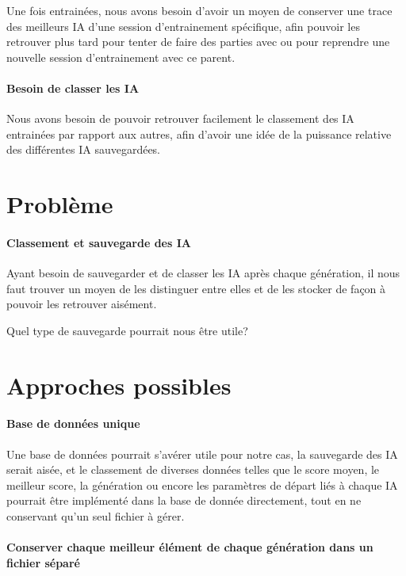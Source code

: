 \documentclass{scrreprt}
\begin{document}
			Une fois entrainées, nous avons besoin d'avoir un moyen de conserver une trace des meilleurs IA d'une session d'entrainement spécifique, afin pouvoir les retrouver plus tard pour tenter de faire des parties avec ou pour reprendre une nouvelle session d'entrainement avec ce parent.
		
			\paragraph{Besoin de classer les IA}
			
			Nous avons besoin de pouvoir retrouver facilement le classement des IA entrainées par rapport aux autres, afin d'avoir une idée de la puissance relative des différentes IA sauvegardées.
			
		
		\section{Problème}
		
			\paragraph{Classement et sauvegarde des IA}
			
			Ayant besoin de sauvegarder et de classer les IA après chaque génération, il nous faut trouver un moyen de les distinguer entre elles et de les stocker de façon à pouvoir les retrouver aisément.
			
			Quel type de sauvegarde pourrait nous être utile?
		
		\section{Approches possibles}
			\paragraph{Base de données unique}
			
			Une base de données pourrait s'avérer utile pour notre cas, la sauvegarde des IA serait aisée, et le classement de diverses données telles que le score moyen, le meilleur score, la génération ou encore les paramètres de départ liés à chaque IA pourrait  être implémenté dans la base de donnée directement, tout en ne conservant qu'un seul fichier à gérer.
			
			
			\paragraph{Conserver chaque meilleur élément de chaque génération dans un fichier séparé}
			
\end{document}
